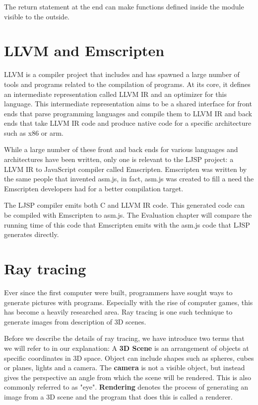 \documentclass[11pt]{report}
\begin{document}
The return statement at the end can make functions defined inside the module visible to the outside.

\section{LLVM and Emscripten}
LLVM is a compiler project that includes and has spawned a large number of tools and programs related to the compilation of programs. At its core, it defines an intermediate representation called LLVM IR and an optimizer for this language. This intermediate representation aims to be a shared interface for front ends that parse programming languages and compile them to LLVM IR and back ends that take LLVM IR code and produce native code for a specific architecture such as x86 or arm. 

While a large number of these front and back ends for various languages and architectures have been written, only one is relevant to the LJSP project: a LLVM IR to JavaScript compiler called Emscripten. Emscripten was written by the same people that invented asm.js, in fact, asm.js was created to fill a need the Emscripten developers had for a better compilation target.

The LJSP compiler emits both C and LLVM IR code. This generated code can be compiled with Emscripten to asm.js. The Evaluation chapter will compare the running time of this code that Emscripten emits with the asm.js code that LJSP generates directly.

\section{Ray tracing}
Ever since the first computer were built, programmers have sought ways to generate pictures with programs. Especially with the rise of computer games, this has become a heavily researched area. Ray tracing is one such technique to generate images from description of 3D scenes.

Before we describe the details of ray tracing, we have introduce two terms that we will refer to in our explanation: A \textbf{3D Scene} is an arrangement of objects at specific coordinates in 3D space. Object can include shapes such as spheres, cubes or planes, lights and a camera. The \textbf{camera} is not a visible object, but instead gives the perspective an angle from which the scene will be rendered. This is also commonly referred to as "eye". \textbf{Rendering} denotes the process of generating an image from a 3D scene and the program that does this is called a renderer.
\end{document}
